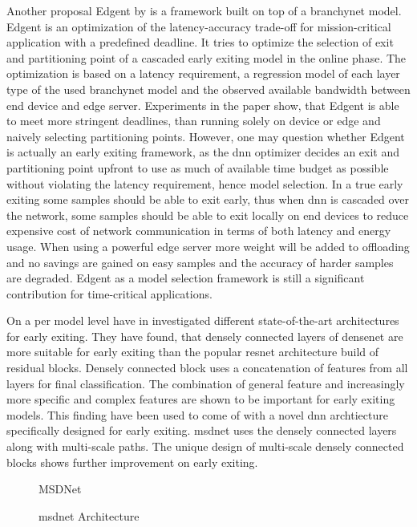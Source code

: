 Another proposal Edgent \cite{li_edge_2018} by \citeauthor{li_edge_2018} is a framework built on top of a \gls{branchynet} model. Edgent is an optimization of the latency-accuracy trade-off for mission-critical application with a predefined deadline. It tries to optimize the selection of exit and partitioning point of a cascaded early exiting model in the online phase. The optimization is based on a latency requirement, a regression model of each layer type of the used \gls{branchynet} model and the observed available bandwidth between end device and edge server. Experiments in the paper show, that Edgent is able to meet more stringent deadlines, than running solely on device or edge and naively selecting partitioning points. However, one may question whether Edgent is actually an early exiting framework, as the \gls{dnn} optimizer decides an exit and partitioning point upfront to use as much of available time budget as possible without violating the latency requirement, hence model selection. In a true early exiting some samples should be able to exit early, thus when \gls{dnn} is cascaded over the network, some samples should be able to exit locally on end devices to reduce expensive cost of network communication in terms of both latency and energy usage. When using a powerful edge server more weight will be added to offloading and no savings are gained on easy samples and the accuracy of harder samples are degraded. Edgent as a model selection framework is still a significant contribution for time-critical applications.

On a per model level \citeauthor{huang_multi-scale_2017} have in \cite{huang_multi-scale_2017} investigated different state-of-the-art architectures for early exiting. They have found, that  densely connected layers of \gls{densenet} \cite{huang_densely_2016} are more suitable for early exiting than the popular \gls{resnet} architecture build of residual blocks. Densely connected block uses a concatenation of features from all layers for final classification. The combination of  general feature and increasingly more specific and complex features are shown to be important for early exiting models. This finding have been used to come of with a novel \gls{dnn} archtiecture specifically designed for early exiting. \gls{msdnet} \cite{huang_multi-scale_2017} uses the densely connected layers along with multi-scale paths. The unique design of multi-scale densely connected blocks shows further improvement on early exiting.

\begin{figure}
	MSDNet
	\caption[\gls{msdnet} Architecture]{\gls{msdnet} Architecture}
\end{figure}

